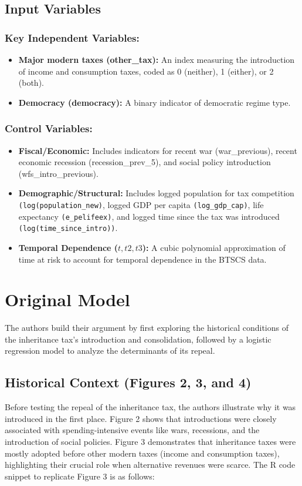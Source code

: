 \documentclass[12pt,letterpaper]{article}
\begin{document}
	\subsection{Input Variables}
	\subsubsection{Key Independent Variables:}
	\begin{itemize}
		\item \textbf{Major modern taxes (other\_tax):} An index measuring the introduction of income and consumption taxes, coded as 0 (neither), 1 (either), or 2 (both).
		\item \textbf{Democracy (democracy):} A binary indicator of democratic regime type.
	\end{itemize}
	
	\subsubsection{Control Variables:}
	\begin{itemize}
		\item \textbf{Fiscal/Economic:} Includes indicators for recent war (war\_previous), recent economic recession (recession\_prev\_5), and social policy introduction (wfs\_intro\_previous).
		\item \textbf{Demographic/Structural:} Includes logged population for tax competition \texttt{(log(population\_new)}, logged GDP per capita \texttt{(log\_gdp\_cap)}, life expectancy \texttt{(e\_pelifeex)}, and logged time since the tax was introduced \texttt{(log(time\_since\_intro))}.
		\item \textbf{Temporal Dependence ($t, t2, t3$): }A cubic polynomial approximation of time at risk to account for temporal dependence in the BTSCS data.
	\end{itemize}
	
	\newpage
	\section{Original Model}
	\noindent The authors build their argument by first exploring the historical conditions of the inheritance tax's introduction and consolidation, followed by a logistic regression model to analyze the determinants of its repeal.
		\vspace{0.3cm}
	\subsection{Historical Context (Figures 2, 3, and 4)}
	\noindent Before testing the repeal of the inheritance tax, the authors illustrate why it was introduced in the first place. Figure 2 shows that introductions were closely associated with spending-intensive events like wars, recessions, and the introduction of social policies. Figure 3 demonstrates that inheritance taxes were mostly adopted before other modern taxes (income and consumption taxes), highlighting their crucial role when alternative revenues were scarce.
	The R code snippet to replicate Figure 3 is as follows:
	
\end{document}
